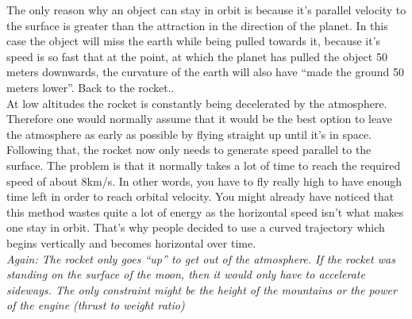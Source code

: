 \documentclass[12pt,paper=A4,numbers=noenddot,bibliography=totoc,listof=totoc,DIV=11,BCOR=1mm]{scrreprt}
\begin{document}
The only reason why an object can stay in orbit is because it's parallel velocity to the surface is greater than the attraction in the direction of the planet. In this case the object will miss the earth while being pulled towards it, because it's speed is so fast that at the point, at which the planet has pulled the object 50 meters downwards, the curvature of the earth will also have ``made the ground 50 meters lower''.
Back to the rocket..\\
At low altitudes the rocket is constantly being decelerated by the atmosphere. Therefore one would normally assume that it would be the best option to leave the atmosphere as early as possible by flying straight up until it's in space. Following that, the rocket now only needs to generate speed parallel to the surface. The problem is that it normally takes a lot of time to reach the required speed of about 8km/s. In other words, you have to fly really high to have enough time left in order to reach orbital velocity. You might already have noticed that this method wastes quite a lot of energy as the horizontal speed isn't what makes one stay in orbit. That's why people decided to use a curved trajectory which begins vertically and becomes horizontal over time.\\
\emph{Again: The rocket only goes ``up'' to get out of the atmosphere. If the rocket was standing on the surface of the moon, then it would only have to accelerate sideways. The only constraint might be the height of the mountains or the power of the engine (thrust to weight ratio)}\\

\end{document}
